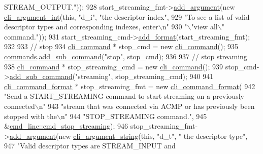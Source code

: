 \begin{DoxyCode}
{       STREAM\_OUTPUT."}));
928     start\_streaming\_fmt->\hyperlink{classcli__command__format_ac3fc6d13a227c195d5ee6f7b78eba9cd}{add\_argument}(\textcolor{keyword}{new} \hyperlink{classcli__argument__int}{cli\_argument\_int}(\textcolor{keyword}{this}, \textcolor{stringliteral}{"d\_i"}, \textcolor{stringliteral}{"the
       descriptor index"},
929                                                            \textcolor{stringliteral}{"To see a list of valid descriptor types and
       corresponding indexes, enter\(\backslash\)n"}
930                                                            \textcolor{stringliteral}{"\(\backslash\)"view all\(\backslash\)" command."}));
931     start\_streaming\_cmd->\hyperlink{classcli__command_aa9ec38e761644d946f8db2b920e39921}{add\_format}(start\_streaming\_fmt);
932 
933     \textcolor{comment}{// stop}
934     \hyperlink{classcli__command}{cli\_command} * stop\_cmd = \textcolor{keyword}{new} \hyperlink{classcli__command}{cli\_command}();
935     \hyperlink{classcmd__line_ae4fea670c2fdd2b60f7b5b6ad6fbaf1e}{commands}.\hyperlink{classcli__command_aa73a67e8ebb6facd4b40ced66279b226}{add\_sub\_command}(\textcolor{stringliteral}{"stop"}, stop\_cmd);
936 
937     \textcolor{comment}{// stop streaming}
938     \hyperlink{classcli__command}{cli\_command} * stop\_streaming\_cmd = \textcolor{keyword}{new} \hyperlink{classcli__command}{cli\_command}();
939     stop\_cmd->\hyperlink{classcli__command_aa73a67e8ebb6facd4b40ced66279b226}{add\_sub\_command}(\textcolor{stringliteral}{"streaming"}, stop\_streaming\_cmd);
940 
941     \hyperlink{classcli__command__format}{cli\_command\_format} * stop\_streaming\_fmt = \textcolor{keyword}{new} 
      \hyperlink{classcli__command__format}{cli\_command\_format}(
942         \textcolor{stringliteral}{"Send a START\_STREAMING command to start streaming on a previously connected\(\backslash\)n"}
943         \textcolor{stringliteral}{"stream that was connected via ACMP or has previously been stopped with the\(\backslash\)n"}
944         \textcolor{stringliteral}{"STOP\_STREAMING command."},
945         &\hyperlink{classcmd__line_a7ab3b0bf5e3be7c1d5abec9aea3322ac}{cmd\_line::cmd\_stop\_streaming});
946     stop\_streaming\_fmt->\hyperlink{classcli__command__format_ac3fc6d13a227c195d5ee6f7b78eba9cd}{add\_argument}(\textcolor{keyword}{new} \hyperlink{classcli__argument__string}{cli\_argument\_string}(\textcolor{keyword}{this}, \textcolor{stringliteral}{"d\_t"}, \textcolor{stringliteral}{"
      the descriptor type"},
947                                                              \textcolor{stringliteral}{"Valid descriptor types are STREAM\_INPUT and
}
\end{DoxyCode}
